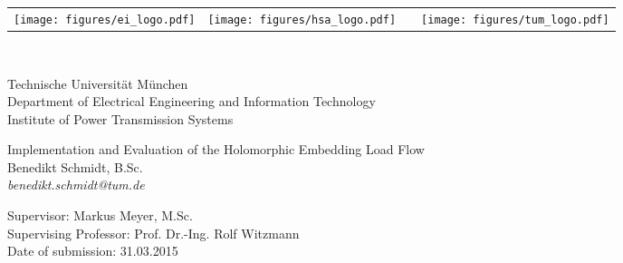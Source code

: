 \begin{titlepage}
	
	\begin{flushleft}
		\begin{tabularx}{\linewidth}{@{}llXr@{}}
			\texttt{[image: figures/ei\_logo.pdf]} &	
			\texttt{[image: figures/hsa\_logo.pdf]} & 
			& 
			\texttt{[image: figures/tum\_logo.pdf]}
		\end{tabularx}
	\end{flushleft}
	\hfill \\[1cm]
	
	\begin{flushleft}
		Technische Universität München \\
		Department of Electrical Engineering and Information Technology \\
		Institute of Power Transmission Systems \\[4cm]
	\end{flushleft}
		
	\begin{center}
		\huge
		Implementation and Evaluation of the Holomorphic Embedding Load Flow \\[1cm]
		\large
		Benedikt Schmidt, B.Sc. \\
		\textit{benedikt.schmidt@tum.de} \\[7cm]
	\end{center}
	
	\begin{flushleft}
		Supervisor: Markus Meyer, M.Sc. \\
		Supervising Professor: Prof. Dr.-Ing. Rolf Witzmann \\
		Date of submission: 31.03.2015
	\end{flushleft}
\end{titlepage}